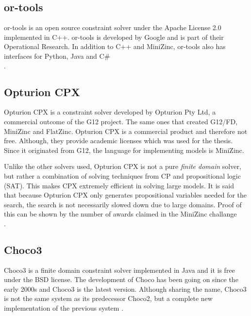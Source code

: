 \subsection{or-tools}
or-tools is an open source constraint solver under the Apache License 2.0 implemented in C++. or-tools is developed by Google and is part of their Operational Research. In addition to C++ and MiniZinc, or-tools also has interfaces for Python, Java and C\#\\
\cite{or_manual}.
\subsection{Opturion CPX}
Opturion CPX is a constraint solver developed by Opturion Pty Ltd, a commercial outcome of the G12 project. The same ones that created G12/FD, MiniZinc and FlatZinc. Opturion CPX is a commercial product and therefore not free. Although, they provide academic licenses which was used for the thesis. Since it originated from G12, the language for implementing models is MiniZinc.

Unlike the other solvers used, Opturion CPX is not a pure \emph{finite domain} solver, but rather a combination of solving techniques from CP and propositional logic (SAT). This makes CPX extremely efficient in solving large models.
It is said that because Opturion CPX only generates propositional variables needed for the search, the search is not necessarily slowed down due to large domains.
Proof of this can be shown by the number of awards claimed in the MiniZinc challange
\cite{cpx}\\
\cite{cpx_about}
\cite{cpx_site}.
\subsection{Choco3}
Choco3 is a finite domain \cite{choco_paper} constraint solver implemented in Java and it is free under the BSD license. The development of Choco has been going on since the early 2000s and Choco3 is the latest version. Although sharing the name, Choco3 is not the same system as its predecessor Choco2, but a complete new implementation of the previous system \cite{choco}.
